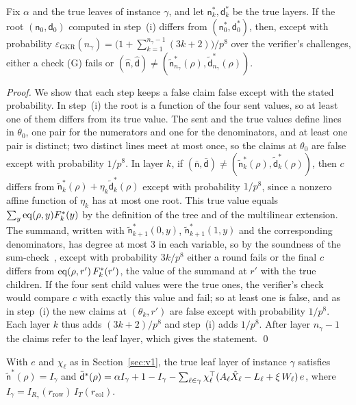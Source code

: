 \begin{lemma}
  \label{lem:v1-gkr}
  Fix $\alpha$ and the true leaves of instance $\gamma$, and let $\mathsf n^\ast_k, \mathsf
  d^\ast_k$ be the true layers. If the root $(\mathsf n_0, \mathsf d_0)$ computed in step~(i)
  differs from $(\mathsf n^\ast_0, \mathsf d^\ast_0)$, then, except with probability
  $\varepsilon_{\mathrm{GKR}}(n_\gamma) = \big(1 + \sum_{k=1}^{n_\gamma - 1} (3k + 2)\big)/p^8$
  over the verifier's challenges, either a check (G) fails or $(\hat{\mathsf n}, \hat{\mathsf d})
  \neq (\tilde{\mathsf n}^\ast_{n_\gamma}(\rho), \tilde{\mathsf d}^\ast_{n_\gamma}(\rho))$.
\end{lemma}

\noindent\emph{Proof.} We show that each step keeps a false claim false except with the stated
probability. In step~(i) the root is a function of the four sent values, so at least one of them
differs from its true value. The sent and the true values define lines in $\theta_0$, one pair for
the numerators and one for the denominators, and at least one pair is distinct; two distinct lines
meet at most once, so the claims at $\theta_0$ are false except with probability $1/p^8$. In layer
$k$, if $(\bar{\mathsf n}, \bar{\mathsf d}) \ne (\tilde{\mathsf n}^\ast_k(\rho), \tilde{\mathsf
d}^\ast_k(\rho))$, then $c$ differs from $\tilde{\mathsf n}^\ast_k(\rho) + \eta_k
\tilde{\mathsf d}^\ast_k(\rho)$ except with probability $1/p^8$, since a nonzero affine function
of $\eta_k$ has at most one root. This true value equals $\sum_y \mathrm{eq}(\rho, y) F^\ast_k(y)$ by
the definition of the tree and of the multilinear extension. The summand, written with
$\tilde{\mathsf n}^\ast_{k+1}(0, y)$, $\tilde{\mathsf n}^\ast_{k+1}(1, y)$ and the corresponding
denominators, has degree at most 3 in each variable, so by the soundness of the
sum-check~\cite{lfkn1992}, except with probability $3k/p^8$ either a round fails or the final $c$
differs from $\mathrm{eq}(\rho, r')\, F^\ast_k(r')$, the value of the summand at $r'$ with the true
children. If the four sent child values were the true ones, the verifier's check would compare $c$
with exactly this value and fail; so at least one is false, and as in step~(i) the new claims at
$(\theta_k, r')$ are false except with probability $1/p^8$. Each layer $k$ thus adds $(3k +
2)/p^8$ and step~(i) adds $1/p^8$. After layer $n_\gamma - 1$ the claims refer to the leaf layer,
which gives the statement. \qed

\begin{lemma}
  \label{lem:v1-final}
  With $e$ and $\chi_\ell$ as in Section~\ref{sec:v1}, the true leaf layer of instance $\gamma$
  satisfies $\tilde{\mathsf n}^\ast(\rho) = I_\gamma$ and $\tilde{\mathsf d}^\ast(\rho) = \alpha
  I_\gamma + 1 - I_\gamma - \sum_{\ell \in \gamma} \chi_\ell^\top (A_\ell \hat X_\ell - L_\ell +
  \xi\, W_\ell)\, e$, where $I_\gamma = I_{R_\gamma}(r_{\mathrm{row}})\, I_T(r_{\mathrm{col}})$.
\end{lemma}

